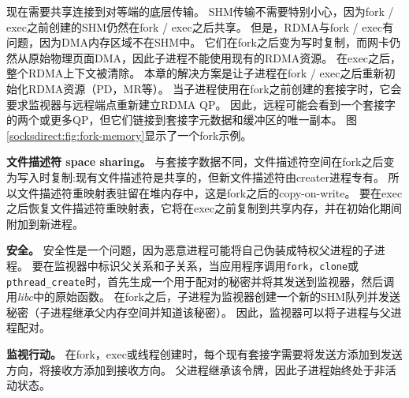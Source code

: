 现在需要共享连接到对等端的底层传输。
SHM传输不需要特别小心，因为fork / exec之前创建的SHM仍然在fork / exec之后共享。
但是，RDMA与fork / exec有问题，因为DMA内存区域不在SHM中。
它们在fork之后变为写时复制，而网卡仍然从原始物理页面DMA，因此子进程不能使用现有的RDMA资源。
在exec之后，整个RDMA上下文被清除。
本章的解决方案是让子进程在fork / exec之后重新初始化RDMA资源（PD，MR等）。
当子进程使用在fork之前创建的套接字时，它会要求监视器与远程端点重新建立RDMA QP。
因此，远程可能会看到一个套接字的两个或更多QP，但它们链接到套接字元数据和缓冲区的唯一副本。
图 \ref {socksdirect:fig:fork-memory}显示了一个fork示例。

\textbf {文件描述符 space sharing。}
与套接字数据不同，文件描述符空间在fork之后变为写入时复制:现有文件描述符是共享的，但新文件描述符由creater进程专有。
所以文件描述符重映射表驻留在堆内存中，这是fork之后的copy-on-write。
要在exec之后恢复文件描述符重映射表，它将在exec之前复制到共享内存，并在\libipc {}初始化期间附加到新进程。

\textbf{安全。}
安全性是一个问题，因为恶意进程可能将自己伪装成特权父进程的子进程。
要在监视器中标识父关系和子关系，当应用程序调用\texttt {fork}，\texttt {clone}或\texttt {pthread\_create}时，\libipc {}首先生成一个用于配对的秘密并将其发送到监视器，然后调用\emph {libc}中的原始函数。
在fork之后，子进程为监视器创建一个新的SHM队列并发送秘密（子进程继承父内存空间并知道该秘密）。
因此，监视器可以将子进程与父进程配对。

\textbf {监视行动。}
在fork，exec或线程创建时，每个现有套接字需要将发送方添加到发送方向，将接收方添加到接收方向。
父进程继承该令牌，因此子进程始终处于非活动状态。



